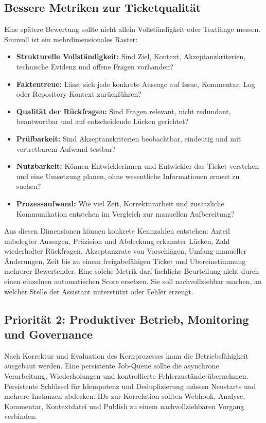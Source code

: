 \subsection{Bessere Metriken zur Ticketqualität}

Eine spätere Bewertung sollte nicht allein Vollständigkeit oder Textlänge messen. Sinnvoll ist ein mehrdimensionales Raster:

\begin{itemize}[leftmargin=0.8cm]
\item \textbf{Strukturelle Vollständigkeit:} Sind Ziel, Kontext, Akzeptanzkriterien, technische Evidenz und offene Fragen vorhanden?
\item \textbf{Faktentreue:} Lässt sich jede konkrete Aussage auf Issue, Kommentar, Log oder Repository-Kontext zurückführen?
\item \textbf{Qualität der Rückfragen:} Sind Fragen relevant, nicht redundant, beantwortbar und auf entscheidende Lücken gerichtet?
\item \textbf{Prüfbarkeit:} Sind Akzeptanzkriterien beobachtbar, eindeutig und mit vertretbarem Aufwand testbar?
\item \textbf{Nutzbarkeit:} Können Entwicklerinnen und Entwickler das Ticket verstehen und eine Umsetzung planen, ohne wesentliche Informationen erneut zu suchen?
\item \textbf{Prozessaufwand:} Wie viel Zeit, Korrekturarbeit und zusätzliche Kommunikation entstehen im Vergleich zur manuellen Aufbereitung?
\end{itemize}

Aus diesen Dimensionen können konkrete Kennzahlen entstehen: Anteil unbelegter Aussagen, Präzision und Abdeckung erkannter Lücken, Zahl wiederholter Rückfragen, Akzeptanzrate von Vorschlägen, Umfang manueller Änderungen, Zeit bis zu einem freigabefähigen Ticket und Übereinstimmung mehrerer Bewertender. Eine solche Metrik darf fachliche Beurteilung nicht durch einen einzelnen automatischen Score ersetzen. Sie soll nachvollziehbar machen, an welcher Stelle der Assistant unterstützt oder Fehler erzeugt.

\subsection{Priorität 2: Produktiver Betrieb, Monitoring und Governance}

Nach Korrektur und Evaluation des Kernprozesses kann die Betriebsfähigkeit ausgebaut werden. Eine persistente Job-Queue sollte die asynchrone Verarbeitung, Wiederholungen und kontrollierte Fehlerzustände übernehmen. Persistente Schlüssel für Idempotenz und Deduplizierung müssen Neustarts und mehrere Instanzen abdecken. IDs zur Korrelation sollten Webhook, Analyse, Kommentar, Kontextdatei und Publish zu einem nachvollziehbaren Vorgang verbinden.

